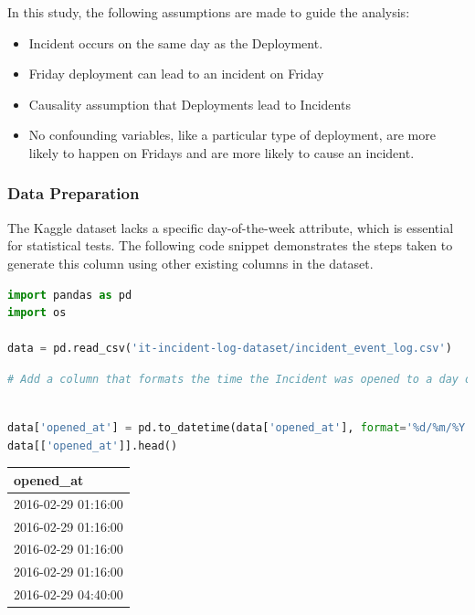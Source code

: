 \documentclass{article}
\begin{document}
In this study, the following assumptions are made to guide the analysis:

\begin{itemize}
    \item Incident occurs on the same day as the Deployment.
    \item Friday deployment can lead to an incident on Friday
    \item Causality assumption that Deployments lead to Incidents
    \item No confounding variables, like a particular type of deployment, are more likely to happen on Fridays and are more likely to cause an incident.    
\end{itemize}


\subsubsection{Data Preparation}


The Kaggle dataset lacks a specific day-of-the-week attribute, which is essential for statistical tests. The following code snippet demonstrates the steps taken to generate this column using other existing columns in the dataset.

\begin{lstlisting}[language=Python, breaklines=true]
import pandas as pd
import os

data = pd.read_csv('it-incident-log-dataset/incident_event_log.csv')

\end{lstlisting}
\begin{lstlisting}[language=Python, breaklines=true]
# Add a column that formats the time the Incident was opened to a day of the week
\end{lstlisting}

\begin{lstlisting}[language=Python, breaklines=true]

data['opened_at'] = pd.to_datetime(data['opened_at'], format='%d/%m/%Y %H:%M', errors='coerce')
data[['opened_at']].head()    
\end{lstlisting}
\begin{table}[H]
\centering
\begin{flushleft}
\begin{tabular}{|l|}
\hline
\textbf{opened\_at} \\
\hline
2016-02-29 01:16:00 \\
2016-02-29 01:16:00 \\
2016-02-29 01:16:00 \\
2016-02-29 01:16:00 \\
2016-02-29 04:40:00 \\
\hline
\end{tabular}
\end{flushleft}
\end{table}
\end{document}
